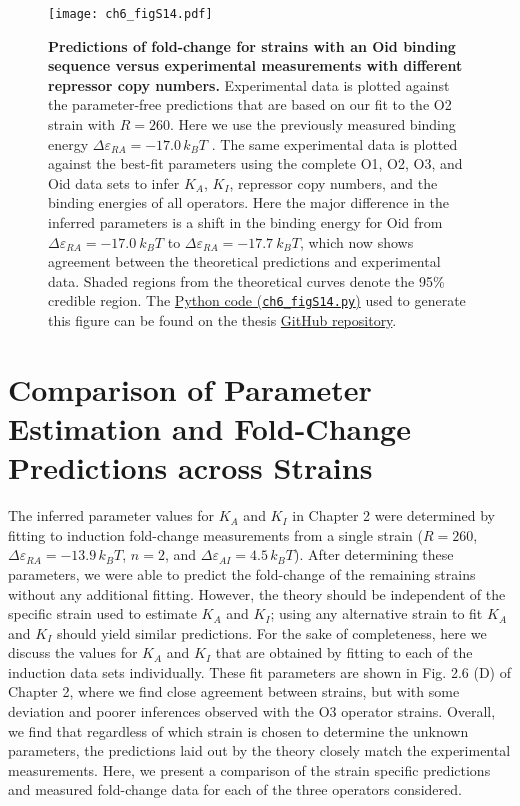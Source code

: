\documentclass[12pt]{caltech_thesis}
\begin{document}
\hypertarget{fig:oid_refit}{%
\begin{figure}
\centering
\texttt{[image: ch6\_figS14.pdf]}
\caption[{Predictions of fold-change for strains with an Oid binding
sequence versus experimental measurements with different repressor copy
numbers.}]{\textbf{Predictions of fold-change for strains with an Oid
binding sequence versus experimental measurements with different
repressor copy numbers.} Experimental data is plotted against the
parameter-free predictions that are based on our fit to the O2 strain
with \(R=260\). Here we use the previously measured binding energy
\(\Delta\varepsilon_{RA}=-17.0\,k_BT\) \autocite{garcia2011}. The same
experimental data is plotted against the best-fit parameters using the
complete O1, O2, O3, and Oid data sets to infer \(K_A\), \(K_I\),
repressor copy numbers, and the binding energies of all operators. Here
the major difference in the inferred parameters is a shift in the
binding energy for Oid from \(\Delta\varepsilon_{RA}=-17.0~k_BT\) to
\(\Delta\varepsilon_{RA}=-17.7~k_BT\), which now shows agreement between
the theoretical predictions and experimental data. Shaded regions from
the theoretical curves denote the 95\% credible region. The
\href{https://github.com/gchure/phd/blob/master/src/chapter_06/code/ch6_figS14.py}{Python
code (\texttt{ch6\_figS14.py})} used to generate this figure can be
found on the thesis \href{https://github.com/gchure/phd}{GitHub
repository}.}
\label{fig:oid_refit}
\end{figure}
}

\hypertarget{comparison-of-parameter-estimation-and-fold-change-predictions-across-strains}{%
\section{Comparison of Parameter Estimation and Fold-Change Predictions
across
Strains}\label{comparison-of-parameter-estimation-and-fold-change-predictions-across-strains}}

The inferred parameter values for \(K_A\) and \(K_I\) in Chapter 2 were
determined by fitting to induction fold-change measurements from a
single strain (\(R=260\), \(\Delta\varepsilon_{RA} = -13.9\,k_BT\),
\(n=2\), and \(\Delta\varepsilon_{AI}=4.5\,k_BT\)). After determining
these parameters, we were able to predict the fold-change of the
remaining strains without any additional fitting. However, the theory
should be independent of the specific strain used to estimate \(K_A\)
and \(K_I\); using any alternative strain to fit \(K_A\) and \(K_I\)
should yield similar predictions. For the sake of completeness, here we
discuss the values for \(K_A\) and \(K_I\) that are obtained by fitting
to each of the induction data sets individually. These fit parameters
are shown in Fig. 2.6 (D) of Chapter 2, where we find close agreement
between strains, but with some deviation and poorer inferences observed
with the O3 operator strains. Overall, we find that regardless of which
strain is chosen to determine the unknown parameters, the predictions
laid out by the theory closely match the experimental measurements.
Here, we present a comparison of the strain specific predictions and
measured fold-change data for each of the three operators considered.
\end{document}
